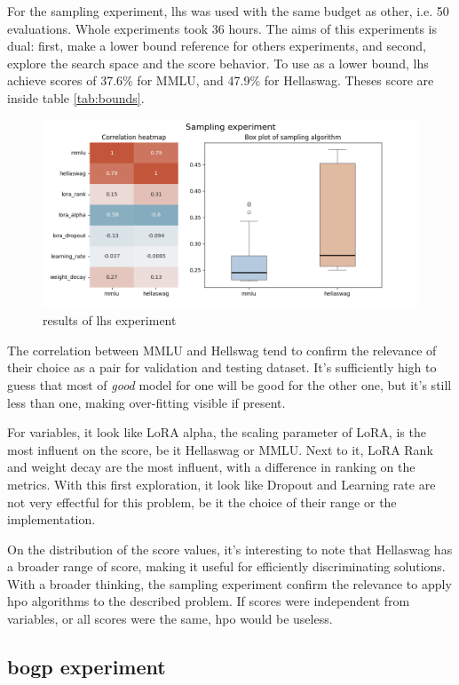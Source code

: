 For the sampling experiment, \acrshort{lhs} was used with the same budget as other, i.e. 50 evaluations. Whole experiments took 36 hours. The aims of this experiments is dual: first, make a lower bound reference for others experiments, and second, explore the search space and the score behavior. To use as a lower bound, \acrshort{lhs} achieve scores of 37.6\% for MMLU, and 47.9\% for Hellaswag. Theses score are inside table \ref{tab:bounds}.

\begin{figure}
    \centering
    \includegraphics[width=0.6\linewidth]{assets/img/chap_4/experiments/plots/sampling/lhs.png}
    \caption{results of \acrlong{lhs} experiment}
    \label{fig:lhs_exp}
\end{figure}

The correlation between MMLU and Hellswag tend to confirm the relevance of their choice as a pair for validation and testing dataset. It's sufficiently high to guess that most of \textit{good} model for one will be good for the other one, but it's still less than one, making over-fitting visible if present.

For variables, it look like LoRA alpha, the scaling parameter of LoRA, is the most influent on the score, be it Hellaswag or MMLU. Next to it, LoRA Rank and weight decay are the most influent, with a difference in ranking on the metrics. With this first exploration, it look like Dropout and Learning rate are not very effectful for this problem, be it the choice of their range or the implementation. 

On the distribution of the score values, it's interesting to note that Hellaswag has a broader range of score, making it useful for efficiently discriminating solutions.  With a broader thinking, the sampling experiment confirm the relevance to apply \acrshort{hpo} algorithms to the described problem. If scores were independent from variables, or all scores were the same, \acrshort{hpo} would be useless. 

\subsection{\acrshort{bogp} experiment}
\label{sec:bo_exp}

